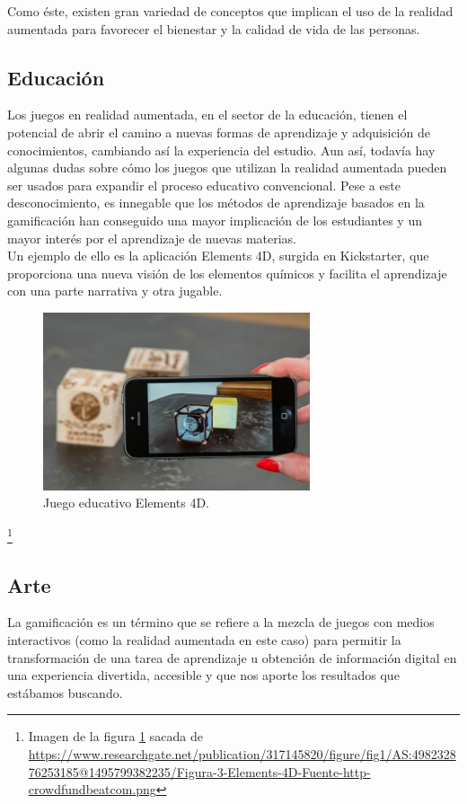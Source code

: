 Como éste, existen gran variedad de conceptos que implican el uso de la realidad aumentada para favorecer el bienestar y la calidad de vida de las personas.\cite{ARGames_Gamification}
\subsection{Educación}
Los juegos en realidad aumentada, en el sector de la educación, tienen el potencial de abrir el camino a nuevas formas de aprendizaje y adquisición de conocimientos, cambiando así la experiencia del estudio. Aun así, todavía hay algunas dudas sobre cómo los juegos que utilizan la realidad aumentada pueden ser usados para expandir el proceso educativo convencional. Pese a este desconocimiento, es innegable que los métodos de aprendizaje basados en la gamificación han conseguido una mayor implicación de los estudiantes y un mayor interés por el aprendizaje de nuevas materias.\cite{ARGames_Gamification}\\

Un ejemplo de ello es la aplicación Elements 4D, surgida en Kickstarter, que proporciona una nueva visión de los elementos químicos y facilita el aprendizaje con una parte narrativa y otra jugable.

\begin{figure}[H]
     \centering
     \includegraphics[width=0.7\textwidth]{Images/Figura-3-Elements-4D.png}
     \caption{Juego educativo Elements 4D.}
     \label{fig:Elemets}
 \end{figure}
 {\let\thefootnote\relax\footnote{{Imagen de la figura \ref{fig:Elemets} sacada de \url{https://www.researchgate.net/publication/317145820/figure/fig1/AS:498232876253185@1495799382235/Figura-3-Elements-4D-Fuente-http-crowdfundbeatcom.png}}}}

\subsection{Arte}
La gamificación es un término que se refiere a la mezcla de juegos con medios interactivos (como la realidad aumentada en este caso) para permitir la transformación de una tarea de aprendizaje u obtención de información digital en una experiencia divertida, accesible y que nos aporte los resultados que estábamos buscando.\\

